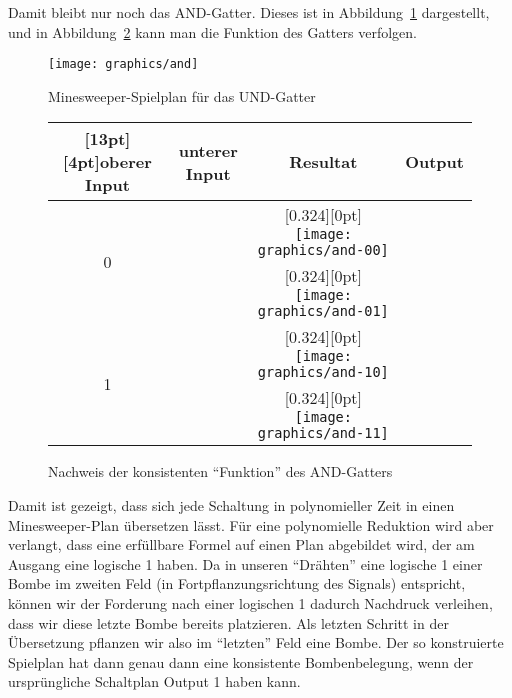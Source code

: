 Damit bleibt nur noch das AND-Gatter.
Dieses ist in Abbildung~\ref{andgate}
dargestellt, und in Abbildung~\ref{andstates} kann man die Funktion des
Gatters verfolgen.

\begin{figure}
\begin{center}
\texttt{[image: graphics/and]}
\end{center}
\caption{Minesweeper-Spielplan für das UND-Gatter\label{andgate}}
\end{figure}%
\begin{figure}
\begin{center}
\begin{tabular}{|c|c|c|c|}
\hline
\raisebox{0pt}[13pt][4pt]{oberer Input}&unterer Input&Resultat&Output\\
\hline
\multirow{2}{10pt}{0}&%
\raisebox{11ex}{$0$}&%
\raisebox{0pt}[0.324\hsize][0pt]{%
\texttt{[image: graphics/and-00]}}&%
\raisebox{11ex}{$0$}%
\\
\cline{2-4}
&\raisebox{11ex}{$1$}&%
\raisebox{0pt}[0.324\hsize][0pt]{%
\texttt{[image: graphics/and-01]}}&%
\raisebox{11ex}{$0$}%
\\
\hline
\multirow{2}{10pt}{1}&%
\raisebox{11ex}{$0$}&%
\raisebox{0pt}[0.324\hsize][0pt]{%
\texttt{[image: graphics/and-10]}}&%
\raisebox{11ex}{$0$}%
\\
\cline{2-4}
&\raisebox{11ex}{$1$}&%
\raisebox{0pt}[0.324\hsize][0pt]{%
\texttt{[image: graphics/and-11]}}&%
\raisebox{11ex}{$1$}%
\\
\hline
\end{tabular}
\end{center}
\caption{Nachweis der konsistenten ``Funktion'' des AND-Gatters
\label{andstates}}
\end{figure}%

Damit ist gezeigt, dass sich jede Schaltung in polynomieller Zeit in 
einen Minesweeper-Plan übersetzen lässt.
Für eine polynomielle
Reduktion wird aber verlangt, dass eine erfüllbare Formel auf einen
Plan abgebildet wird, der am Ausgang eine logische 1 haben.
Da in unseren ``Drähten'' eine logische 1 einer Bombe im zweiten
Feld (in Fortpflanzungsrichtung des Signals) entspricht, können
wir der Forderung nach einer logischen 1 dadurch Nachdruck verleihen,
dass wir diese letzte Bombe bereits platzieren.
Als letzten Schritt
in der Übersetzung pflanzen wir also im ``letzten'' Feld eine Bombe.
Der so konstruierte Spielplan hat dann genau dann eine konsistente
Bombenbelegung, wenn der ursprüngliche Schaltplan Output 1 haben kann.

